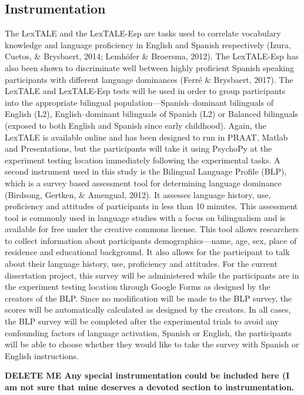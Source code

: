 \subsection{Instrumentation}
The LexTALE and the LexTALE-Esp are tasks used to correlate vocabulary knowledge and language proficiency in English and Spanish respectively (Izura, Cuetos, \& Brysbaert, 2014; Lemhöfer \& Broersma, 2012). The LexTALE-Esp has also been shown to discriminate well between highly proficient Spanish speaking participants with different language dominances (Ferré \& Brysbaert, 2017). The LexTALE and LexTALE-Esp tests will be used in order to group participants into the appropriate bilingual population—Spanish–dominant bilinguals of English (L2), English–dominant bilinguals of Spanish (L2) or Balanced bilinguals (exposed to both English and Spanish since early childhood). Again, the LexTALE is available online and has been designed to run in PRAAT, Matlab and Presentations, but the participants will take it using PsychoPy at the experiment testing location immediately following the experimental tasks. 
A second instrument used in this study is the Bilingual Language Profile (BLP), which is a survey based assessment tool for determining language dominance (Birdsong, Gertken, \& Amengual, 2012). It assesses language history, use, proficiency and attitudes of participants in less than 10 minutes. This assessment tool is commonly used in language studies with a focus on bilingualism and is available for free under the creative commons license. This tool allows researchers to collect information about participants demographics—name, age, sex, place of residence and educational background. It also allows for the participant to talk about their language history, use, proficiency and attitudes. For the current dissertation project, this survey will be administered while the participants are in the experiment testing location through Google Forms as designed by the creators of the BLP. Since no modification will be made to the BLP survey, the scores will be automatically calculated as designed by the creators. In all cases, the BLP survey will be completed after the experimental trials to avoid any confounding factors of language activation, Spanish or English, the participants will be able to choose whether they would like to take the survey with Spanish or English instructions.


\textbf{DELETE ME Any special instrumentation could be included here (I am not sure that mine deserves a devoted section to instrumentation.}



